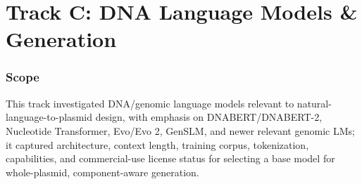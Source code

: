 \documentclass[11pt]{report}
\begin{document}
\chapter{Track C: DNA Language Models \& Generation}

\subsection{Scope}
This track investigated DNA/genomic language models relevant to natural-language-to-plasmid design, with emphasis on DNABERT/DNABERT-2, Nucleotide Transformer, Evo/Evo 2, GenSLM, and newer relevant genomic LMs; it captured architecture, context length, training corpus, tokenization, capabilities, and commercial-use license status for selecting a base model for whole-plasmid, component-aware generation.\par
\end{document}
